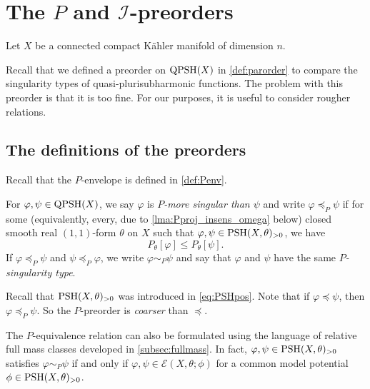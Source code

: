 \section{The \texorpdfstring{$P$}{P} and \texorpdfstring{$\mathcal{I}$}{I}-preorders}\label{sec:PIpartialorder}
Let $X$ be a connected compact Kähler manifold of dimension $n$.


Recall that we defined a preorder on $\mathrm{QPSH}(X)$ in \cref{def:parorder} to compare the singularity types of quasi-plurisubharmonic functions. The problem with this preorder is that it is too fine. For our purposes, it is useful to consider rougher relations.

\subsection{The definitions of the preorders}
\label{subsec:preorder_def}

Recall that the $P$-envelope is defined in \cref{def:Penv}.
\begin{definition}\label{def:Pmoresing}
    For $\varphi,\psi\in \mathrm{QPSH}(X)$, we say $\varphi$ is \emph{$P$-more singular than $\psi$} and write $\varphi\preceq_P \psi$ if for some (equivalently, every, due to \cref{lma:Pproj_insens_omega} below) closed smooth real $(1,1)$-form $\theta$ on $X$ such that $\varphi,\psi\in \mathrm{PSH}(X,\theta)_{>0}$, we have
        \begin{equation}\label{eq:Penvleq}
        P_{\theta}[\varphi]\leq P_{\theta}[\psi].
        \end{equation}
    If $\varphi\preceq_P \psi$ and $\psi \preceq_P \varphi$, we write $\varphi\sim_P \psi$ and say that $\varphi$ and $\psi$ have the same \emph{$P$-singularity type}.
\end{definition}
Recall that $\mathrm{PSH}(X,\theta)_{>0}$ was introduced in \eqref{eq:PSHpos}.
Note that if $\varphi\preceq \psi$, then $\varphi\preceq_P \psi$. So the $P$-preorder is \emph{coarser} than $\preceq$.

The $P$-equivalence relation can also be formulated using the language of relative full mass classes developed in \cref{subsec:fullmass}.
In fact, $\varphi,\psi\in \mathrm{PSH}(X,\theta)_{>0}$ satisfies $\varphi\sim_P \psi$ if and only if $\varphi,\psi \in \mathcal{E}(X,\theta;\phi)$ for a common model potential $\phi\in \mathrm{PSH}(X,\theta)_{>0}$.


